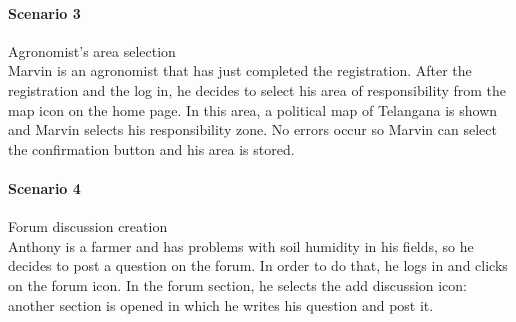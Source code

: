 \bigskip
\paragraph{Scenario 3} Agronomist's area selection\\
Marvin is an agronomist that has just completed the registration. After the registration and the log in,
he decides to select his area of responsibility from the map icon on the home page. In this area, a political map of
Telangana is shown and Marvin selects his responsibility zone. No errors occur so Marvin can select the confirmation
button and his area is stored.

\bigskip
\paragraph{Scenario 4} Forum discussion creation\\
Anthony is a farmer and has problems with soil humidity in his fields, so he decides to post a question on the forum.
In order to do that, he logs in and clicks on the forum icon. In the forum section, he selects the add discussion icon:
another section is opened in which he writes his question and post it.

